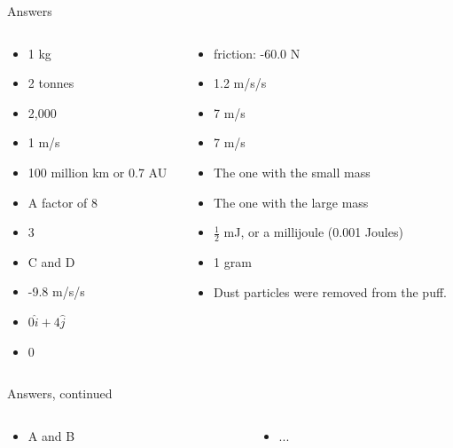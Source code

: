 \documentclass{beamer}
\begin{document}
\begin{frame}{Answers}
\begin{columns}[T]
\begin{column}{0.5\textwidth}
\begin{itemize}
\item 1 kg
\item 2 tonnes
\item 2,000
\item 1 m/s
\item 100 million km or 0.7 AU
\item A factor of 8
\item 3
\item C and D
\item -9.8 m/s/s
\item $0\hat{i}+4\hat{j}$
\item 0
\end{itemize}
\end{column}
\begin{column}{0.5\textwidth}
\begin{itemize}
\item friction: -60.0 N
\item 1.2 m/s/s
\item 7 m/s
\item 7 m/s
\item The one with the small mass
\item The one with the large mass
\item $\frac{1}{2}$ mJ, or a millijoule (0.001 Joules)
\item 1 gram
\item Dust particles were removed from the puff.
\end{itemize}
\end{column}
\end{columns}
\end{frame}

\begin{frame}{Answers, continued}
\begin{columns}[T]
\begin{column}{0.5\textwidth}
\begin{itemize}
\item A and B
\end{itemize}
\end{column}
\begin{column}{0.5\textwidth}
\begin{itemize}
\item ...
\end{itemize}
\end{column}
\end{columns}
\end{frame}
\end{document}

